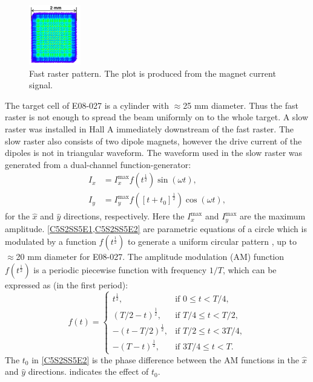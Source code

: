 \begin{figure}[tb!]
  \centering
  \includegraphics[width=0.2\textwidth]{figs/fast-raster-pattern.png}
  \caption[Fast raster pattern.]{Fast raster pattern. The plot is produced from the magnet current signal. \label{C5S2SS5F1}}
\end{figure}

The target cell of E08-027 is a cylinder with $\approx$25 mm diameter. Thus the fast raster is not enough to spread the beam uniformly on to the whole target. A slow raster was installed in Hall A immediately downstream of the fast raster. The slow raster also consists of two dipole magnets, however the drive current of the dipoles is not in triangular waveform. The waveform used in the slow raster was generated from a dual-channel function-generator:
\begin{align} \label{C5S2SS5E1}
I_x & = I_x^{\mathrm{max}}f(t^{\frac{1}{2}})\sin(\omega t), \\ \label{C5S2SS5E2}
I_y & = I_y^{\mathrm{max}}f([t+t_0]^{\frac{1}{2}})\cos(\omega t),
\end{align}
for the $\hat{x}$ and $\hat{y}$ directions, respectively. Here the $I_x^{\mathrm{max}}$ and $I_y^{\mathrm{max}}$ are the maximum amplitude. \cref{C5S2SS5E1,C5S2SS5E2} are parametric equations of a circle which is modulated by a function $f(t^{\frac{1}{2}})$ to generate a uniform circular pattern \cite{Yan2005}, up to $\approx$20 mm diameter for E08-027. The amplitude modulation (AM) function $f(t^{\frac{1}{2}})$ is a periodic piecewise function with frequency $1/T$, which can be expressed as (in the first period):
\begin{equation} \label{C5S2SS5E3}
f(t) =
\begin{cases}
t^{\frac{1}{2}}, & \text{if } 0\leq t<T/4, \\
(T/2-t)^{\frac{1}{2}}, & \text{if } T/4\leq t<T/2, \\
-(t-T/2)^{\frac{1}{2}}, & \text{if } T/2\leq t<3T/4, \\
-(T-t)^{\frac{1}{2}}, & \text{if } 3T/4\leq t<T.
\end{cases}
\end{equation}
The $t_0$ in \cref{C5S2SS5E2} is the phase difference between the AM functions in the $\hat{x}$ and $\hat{y}$ directions.  indicates the effect of $t_0$.

